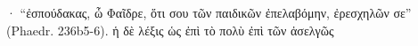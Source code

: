 \documentclass[11pt,a4paper]{book}
\begin{document}
\beginnumbering

 \pstart {}· “ἐσπούδακας, ὦ Φαῖδρε, ὅτι σου τῶν παιδικῶν ἐπελαβόμην, ἐρεσχηλῶν σε” (Phaedr. 236b5-6). ἡ δὲ λέξις ὡς ἐπὶ τὸ πολὺ ἐπὶ τῶν ἀσελγῶς\pend

\numberpstartfalse

\endnumbering
\end{document}
